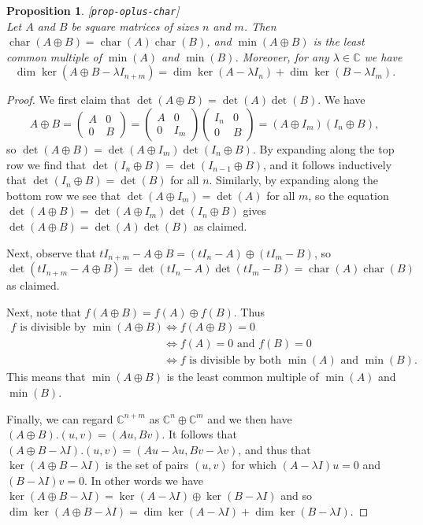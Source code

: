 \documentclass{amsart}
\newcommand{\lbl}[1]{\label{#1}\textup{[\texttt{#1}]}\ \\}
\newcommand{\lbl}{\label}
\newcommand{\chr}       {\operatorname{char}}
\newcommand{\C}         {{\mathbb{C}}}
\newcommand{\lm}        {\lambda}
\newcommand{\op}        {\oplus}
\newcommand{\iffa}      {\Leftrightarrow}
\newcommand{\blockmat}[4]{
 \left(\begin{array}{c|c} #1&#2 \\ \hline #3&#4\end{array}\right)}
\renewcommand{\:}{\colon}
\newtheorem{proposition}[theorem]{Proposition}
\theoremstyle{definition}
\begin{document}
\begin{proposition}\lbl{prop-oplus-char}
 Let $A$ and $B$ be square matrices of sizes $n$ and $m$.  Then
 $\chr(A\op B)=\chr(A)\chr(B)$, and $\min(A\op B)$ is the least
 common multiple of $\min(A)$ and $\min(B)$.  Moreover, for any
 $\lm\in\C$ we have 
 \[ \dim\ker(A\op B-\lm I_{n+m}) = 
     \dim\ker(A-\lm I_n) + \dim\ker(B-\lm I_m). 
 \]
\end{proposition}
\begin{proof}
 We first claim that $\det(A\op B)=\det(A)\det(B)$.  We have
 \[ A\op B = \blockmat{A}{0}{0}{B} = 
    \blockmat{A}{0}{0}{I_m} \blockmat{I_n}{0}{0}{B} =
     (A\op I_m)(I_n\op B),
 \]
 so $\det(A\op B)=\det(A\op I_m)\det(I_n\op B)$.  By expanding along
 the top row we find that $\det(I_n\op B)=\det(I_{n-1}\op B)$, and it
 follows inductively that $\det(I_n\op B)=\det(B)$ for all $n$.
 Similarly, by expanding along the bottom row we see that
 $\det(A\op I_m)=\det(A)$ for all $m$, so the equation
 $\det(A\op B)=\det(A\op I_m)\det(I_n\op B)$ gives
 $\det(A\op B)=\det(A)\det(B)$ as claimed.

 Next, observe that $tI_{n+m}-A\op B=(tI_n-A)\op(tI_m-B)$, so
 $\det(tI_{n+m}-A\op B)=\det(tI_n-A)\det(tI_m-B)=\chr(A)\chr(B)$ as
 claimed.

 Next, note that $f(A\op B)=f(A)\op f(B)$.  Thus
 \begin{align*}
  f \text{ is divisible by } \min(A\op B) 
   & \iffa f(A\op B) = 0\\
   & \iffa f(A) = 0 \text{ and } f(B) = 0 \\
   & \iffa f \text{ is divisible by both }
           \min(A) \text{ and } \min(B).
 \end{align*}
 This means that $\min(A\op B)$ is the least common multiple of
 $\min(A)$ and $\min(B)$.

 Finally, we can regard $\C^{n+m}$ as $\C^n\op\C^m$ and we then have
 $(A\op B).(u,v)=(Au,Bv)$.  It follows that
 $(A\op B-\lm I).(u,v)=(Au-\lm u,Bv-\lm v)$, and thus that
 $\ker(A\op B-\lm I)$ is the set of pairs $(u,v)$ for which
 $(A-\lm I)u=0$ and $(B-\lm I)v=0$.  In other words we have
 $\ker(A\op B-\lm I)=\ker(A-\lm I)\op\ker(B-\lm I)$ and so 
 $\dim\ker(A\op B-\lm I)=\dim\ker(A-\lm I)+\dim\ker(B-\lm I)$.
\end{proof}
\end{document}
